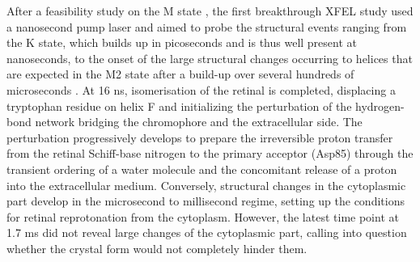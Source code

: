After a feasibility study on the M state \parencite{noglyLipidicCubicPhase2016}, the first breakthrough XFEL study used a nanosecond pump laser and aimed to probe the structural events ranging from the K state, which builds up in picoseconds and is thus well present at nanoseconds, to the onset of the large structural changes occurring to helices that are expected in the M2 state after a build-up over several hundreds of microseconds \parencite{nangoThreedimensionalMovieStructural2016}. At 16 ns, isomerisation of the retinal is completed, displacing a tryptophan residue on helix F and initializing the perturbation of the hydrogen-bond network bridging the chromophore and the extracellular side. The perturbation progressively develops to prepare the irreversible proton transfer from the retinal Schiff-base nitrogen to the primary acceptor (Asp85) through the transient ordering of a water molecule and the concomitant release of a proton into the extracellular medium. Conversely, structural changes in the cytoplasmic part develop in the microsecond to millisecond regime, setting up the conditions for retinal reprotonation from the cytoplasm. However, the latest time point at 1.7 ms did not reveal large changes of the cytoplasmic part, calling into question whether the crystal form would not completely hinder them. 

